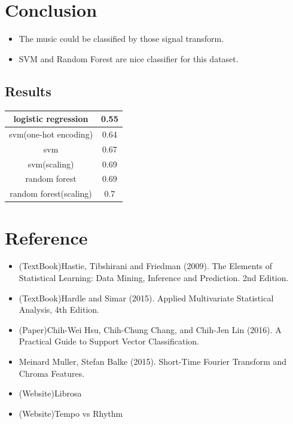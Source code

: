 \documentclass[12pt,a4paper]{article}
\begin{document}
\newpage
\section{Conclusion}
\begin{itemize}
  \item The music could be classified by those signal transform.
  \item SVM and Random Forest are nice classifier for this dataset.
\end{itemize}
\subsection{Results}
\begin{center}
\begin{tabular}{ |c|c| } 
\hline
 logistic regression & 0.55 \\ 
 \hline\hline
 svm(one-hot encoding) & 0.64 \\ 
 \hline
 svm & 0.67 \\ 
 \hline
 svm(scaling) & 0.69 \\ 
 \hline\hline
 random forest & 0.69 \\ 
 \hline
 random forest(scaling) & 0.7 \\ 
 \hline
\end{tabular}
\end{center}

\newpage
\section*{Reference}
\begin{itemize}
  \item (TextBook)Hastie, Tibshirani and Friedman (2009). The Elements of Statistical Learning: Data Mining, Inference and Prediction. 2nd Edition.
  \item (TextBook)Hardle and Simar (2015). Applied Multivariate Statistical Analysis, 4th Edition.
  \item (Paper)Chih-Wei Hsu, Chih-Chung Chang, and Chih-Jen Lin (2016). A Practical Guide to Support Vector Classification.
  \item  Meinard Muller, Stefan Balke (2015). Short-Time Fourier Transform and Chroma Features.
  \item (Website)Librosa
  \item (Website)Tempo vs Rhythm
\end{itemize}
\end{document}
